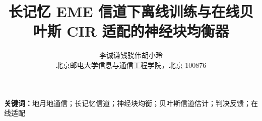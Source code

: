 \documentclass[UTF8,a4paper,zihao=-4]{ctexart}
\title{\bfseries 长记忆 EME 信道下离线训练与在线贝叶斯 CIR 适配的神经块均衡器}
\author{李诚谦\quad 钱骁伟\quad 胡小玲\\[2pt]
\small 北京邮电大学信息与通信工程学院，北京 100876}
\date{}
\begin{document}
\maketitle



\noindent\textbf{关键词：}地月地通信；长记忆信道；神经块均衡；贝叶斯信道估计；判决反馈；在线适配











\end{document}

